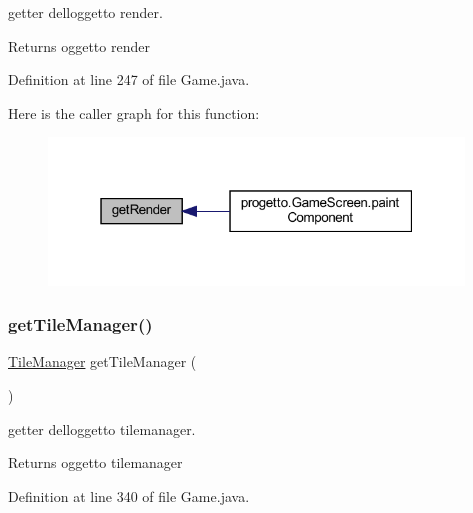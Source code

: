 getter dell\textquotesingle{}oggetto render. 

\begin{DoxyReturn}{Returns}
oggetto render 
\end{DoxyReturn}


Definition at line 247 of file Game.\+java.

Here is the caller graph for this function\+:\nopagebreak
\begin{figure}[H]
\begin{center}
\leavevmode
\includegraphics[width=313pt]{classprogetto_1_1_game_a4cf2c70ad6b93232b970eee06767cab1_icgraph}
\end{center}
\end{figure}
\mbox{\label{classprogetto_1_1_game_ad519f2a339c804d206a38ecd2c33f667}} 
\subsubsection{\texorpdfstring{get\+Tile\+Manager()}{getTileManager()}}
{\footnotesize\ttfamily \hyperlink{classmanagers_1_1_tile_manager}{Tile\+Manager} get\+Tile\+Manager (\begin{DoxyParamCaption}{ }\end{DoxyParamCaption})}



getter dell\textquotesingle{}oggetto tilemanager. 

\begin{DoxyReturn}{Returns}
oggetto tilemanager 
\end{DoxyReturn}


Definition at line 340 of file Game.\+java.

